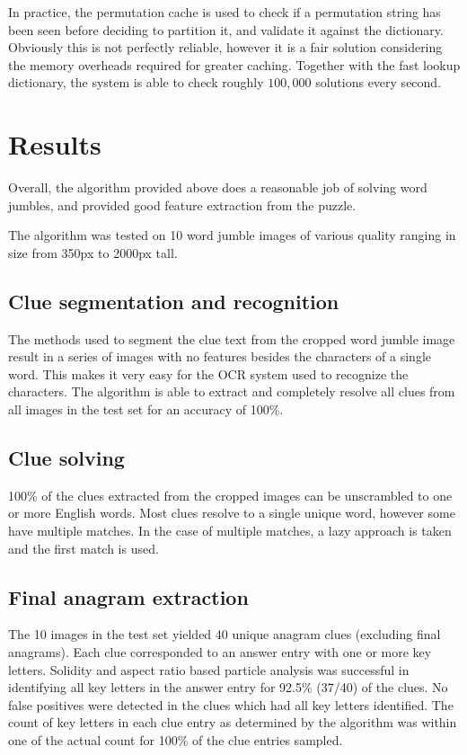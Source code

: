 \documentclass{article}
\begin{document}
	 \vspace{10pt}
	 
	 In practice, the permutation cache is used to check if a permutation string has been seen before deciding to partition it, and validate it against the dictionary.  Obviously this is not perfectly reliable, however it is a fair solution considering the memory overheads required for greater caching.  Together with the fast lookup dictionary, the system is able to check roughly $100,000$ solutions every second.
	 
	\section{Results} 
	Overall, the algorithm provided above does a reasonable job of solving word jumbles, and provided good feature extraction from the puzzle. \par \hspace{10pt}
	The algorithm was tested on 10 word jumble images of various quality ranging in size from 350px to 2000px tall.\par 
	
	\subsection{Clue segmentation and recognition}
	The methods used to segment the clue text from the cropped word jumble image result in a series of images with no features besides the characters of a single word.  This makes it very easy for the OCR system used to recognize the characters.  The algorithm is able to extract and completely resolve all clues from all images in the test set for an accuracy of 100\%.
	
	\subsection{Clue solving}
	100\% of the clues extracted from the cropped images can be unscrambled to one or more English words.  Most clues resolve to a single unique word, however some have multiple matches.  In the case of multiple matches, a lazy approach is taken and the first match is used. 
	
	\subsection{Final anagram extraction}
	The 10 images in the test set yielded 40 unique anagram clues (excluding final anagrams).  Each clue corresponded to an answer entry with one or more key letters.  Solidity and aspect ratio based particle analysis was successful in identifying all key letters in the answer entry for 92.5\% (37/40) of the clues. No false positives were detected in the clues which had all key letters identified. The count of key letters in each clue entry as determined by the algorithm was within one of the actual count for 100\% of the clue entries sampled.
	
\end{document}
